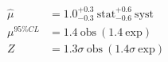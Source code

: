 \begin{align}
\label{eq:tth_bestfit}
\hat{\mu} &= 1.0  ^{+0.3}_{-0.3}~\mathrm{stat} ^{+0.6}_{-0.6}~\mathrm{syst}\\
\mu^{95\%CL} &= 1.4~\mathrm{obs}~(1.4 ~\mathrm{exp}) \\
Z &= 1.3\sigma~\mathrm{obs}~(1.4 \sigma~\mathrm{exp})
\end{align}

\begin{figure}
\begin{centering}
 \\


\end{centering}
\end{figure}
